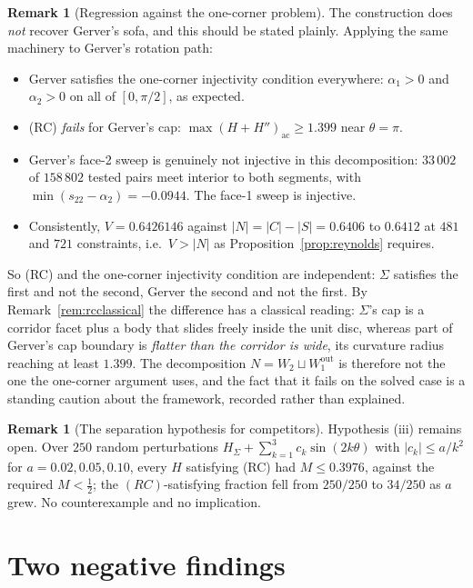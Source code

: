 \documentclass[11pt]{article}
\theoremstyle{definition}
\newtheorem{remark}[theorem]{Remark}
\newcommand{\Sig}{\Sigma}
\begin{document}
\begin{remark}[Regression against the one-corner problem]\label{rem:gerver}
The construction does \emph{not} recover Gerver's sofa, and this should be stated
plainly. Applying the same machinery to Gerver's rotation path:
\begin{itemize}
\item Gerver satisfies the one-corner injectivity condition everywhere:
$\alpha_1>0$ and $\alpha_2>0$ on all of $[0,\pi/2]$, as expected.
\item (RC) \emph{fails} for Gerver's cap: $\max(H+H'')_{\mathrm{ac}}\ge1.399$ near
$\theta=\pi$.
\item Gerver's face-2 sweep is genuinely not injective in this decomposition:
$33\,002$ of $158\,802$ tested pairs meet interior to both segments, with
$\min(s_{22}-\alpha_2)=-0.0944$. The face-1 sweep is injective.
\item Consistently, $V=0.6426146$ against $|N|=|C|-|S|=0.6406$ to $0.6412$ at $481$ and
$721$ constraints, i.e.\ $V>|N|$ as Proposition~\ref{prop:reynolds} requires.
\end{itemize}
So (RC) and the one-corner injectivity condition are independent: $\Sig$ satisfies the
first and not the second, Gerver the second and not the first. By
Remark~\ref{rem:rcclassical} the difference has a classical reading: $\Sig$'s cap is a
corridor facet plus a body that slides freely inside the unit disc, whereas part of
Gerver's cap boundary is \emph{flatter than the corridor is wide}, its curvature radius
reaching at least $1.399$. The decomposition
$N=W_2\sqcup W_1^{\mathrm{out}}$ is therefore not the one the one-corner argument uses,
and the fact that it fails on the solved case is a standing caution about the framework,
recorded rather than explained.
\end{remark}

\begin{remark}[The separation hypothesis for competitors]\label{rem:Mnum}
Hypothesis (iii) remains open. Over $250$ random perturbations
$H_\Sig+\sum_{k=1}^3c_k\sin(2k\theta)$ with $|c_k|\le a/k^2$ for
$a=0.02,0.05,0.10$, every $H$ satisfying (RC) had $M\le0.3976$, against the required
$M<\tfrac12$; the $(RC)$-satisfying fraction fell from $250/250$ to $34/250$ as $a$ grew.
No counterexample and no implication.
\end{remark}

\section{Two negative findings}\label{sec:neg}
\end{document}

